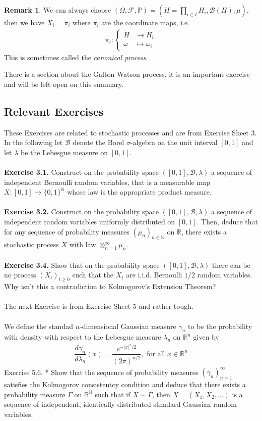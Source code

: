 \documentclass[11pt,a4paper, final]{article}
\theoremstyle{definition}
\newtheorem{rem}{Remark}[section]
\begin{document}
\begin{rem} We can always choose $( \Omega, \mathcal{F}, \mathbb{P}) = ( H = \prod_{i \in I} H_i, \mathcal{B}(H), \mu)$, then we have $X_i = \pi_i$ where $\pi_i$ are the coordinate maps, i.e.
\begin{align*}
\pi_i : \begin{cases} H & \longrightarrow H_i \\ \omega & \longmapsto \omega_i  \end{cases}
\end{align*}
This is sometimes called the \textit{canonical process}. 
\end{rem}
There is a section about the Galton-Watson process, it is an important exercise and will be left open on this summary. 
\newpage 
\subsection{Relevant Exercises}
These Exercises are related to stochastic processes and are from Exercise Sheet 3. In the following let $\mathcal{B}$ denote the Borel $\sigma$-algebra on the unit interval $[0,1]$ and let $\lambda$ be the Lebesgue measure on $[0,1]$. \\
\\
\textbf{Exercise 3.1.} Construct on the probability space $([0,1], \mathcal{B}, \lambda)$ a sequence of independent Bernoulli random variables, that is a measurable map $X: [0,1] \to \lbrace 0,1 \rbrace^\mathbb{N}$ whose law is the appropriate product measure.
\\\\
\textbf{Exercise 3.2.} Construct on the probability space $([0,1], \mathcal{B}, \lambda)$ a sequence of independent random variables uniformly distributed on $[0,1]$. Then, deduce that for any sequence of probability measures $( \mu_n)_{n \in \mathbb{N}}$ on $\mathbb{R}$, there exists a stochastic process $X$ with law $\otimes_{n=1}^\infty \mu_n$. 
\\\\
\textbf{Exercise 3.4.} Show that on the probability space $([0,1], \mathcal{B}, \lambda)$ there can be no process $(X_t)_{t \geq 0}$ such that the $X_t$ are i.i.d. Bernoulli $1/2$ random variables. Why isn't this a contradiction to Kolmogorov's Extension Theorem?
\\\\
The next Exercise is from Exercise Sheet 5 and rather tough. 
\\\\
We define the standad $n$-dimensional Gaussian measure $\gamma_n$ to be the probability with density with respect to the Lebesgue measure $\lambda_n$ on $\mathbb{R}^n$ given by 
\begin{align*}
\dfrac{d \gamma_n}{d \lambda_n}(x) = \dfrac{e^{-|x|^2/2}}{(2 \pi)^{n/2}}, \text{ for all } x \in \mathbb{R}^n 
\end{align*}
Exercise 5.6. * Show that the sequence of probability measures $( \gamma_n)_{n=1}^\infty$ satisfies the Kolmogorov consistentcy condition and deduce that there exists a probability measure $\Gamma$ on $\mathbb{R}^\mathbb{N}$ such that if $X \sim \Gamma$, then $X=(X_1, X_2, \dots )$ is a sequence of independent, identically distributed stnadard Gaussian random variables. 
\newpage
\end{document}
